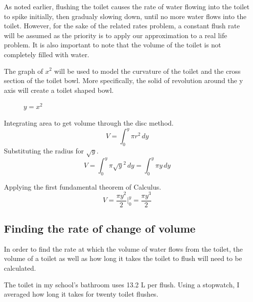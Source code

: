\documentclass[12pt, titlepage]{article}
\begin{document}
As noted earlier, flushing the toilet causes the rate of water flowing into the toilet to spike initially, then gradualy slowing down, until no more water flows into the toilet. However, for the sake of the related rates problem, a constant flush rate will be assumed as the priority is to apply our approximation to a real life problem. It is also important to note that the volume of the toilet is not completely filled with water.  

The graph of \(x^{2}\) will be used to model the curvature of the toilet and the cross section of the toilet bowl. More specifically, the solid of revolution around the y axis will create a toilet shaped bowl. 

\begin{figure}[H]
\centering
    \caption[]{\(y=x^2\)}
\end{figure}

Integrating area to get volume through the disc method.
\begin{equation}
    V = \int^y_0 \pi r^2\,dy
\end{equation}
Substituting the radius for \(\sqrt{y}\).
\begin{equation}
    V = \int^y_0 \pi \sqrt{y}^2\,dy  = \int^y_0 \pi y\,dy 
\end{equation}

Applying the first fundamental theorem of Calculus.
\begin{equation}
    V = \frac{ \pi y^2 }{2} \biggr \rvert^y_0 = \frac{\pi y^3}{2}
\end{equation}

\subsection{Finding the rate of change of volume}
In order to find the rate at which the volume of water flows from the toilet, the volume of a toilet as well as how long it takes the toilet to flush will need to be calculated. 

\pagebreak
The toilet in my school’s bathroom uses 13.2 L per flush. Using a stopwatch, I averaged how long it takes for twenty toilet flushes. 
\end{document}
